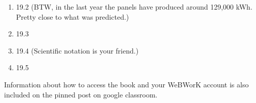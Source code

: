 \documentclass[12pt]{article}
\begin{document}
\begin{enumerate}
  \setlength{\itemsep}{-1mm}
\item 19.2 (BTW, in the last year the panels have produced around
  129,000 kWh. Pretty close to what was predicted.)
\item 19.3
\item 19.4 (Scientific notation is your friend.)
\item 19.5
\end{enumerate}


\noindent Information about how to access the book and your WeBWorK
account is also included on the pinned post on google classroom. 
\end{document}

